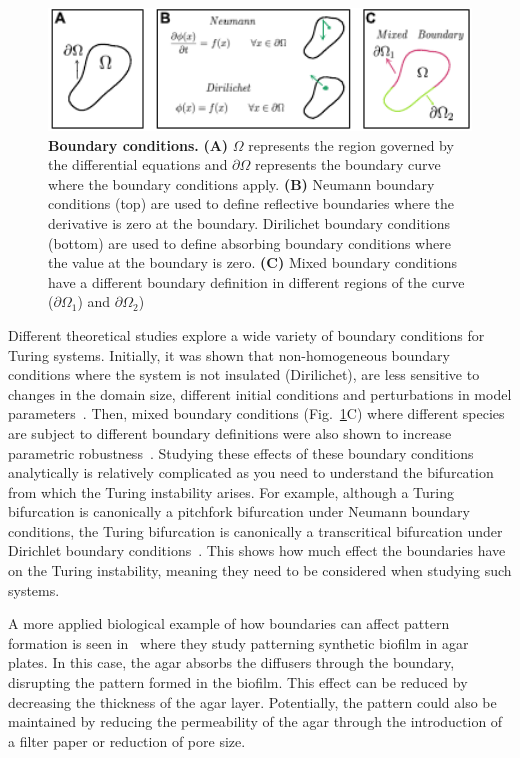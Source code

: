 \begin{figure}[H]
    \centering
    \includegraphics[width=1\textwidth]{chapters/Introduction/boundaries}
    \caption{\textbf{Boundary conditions.} \textbf{(A)} $\Omega$ represents the region governed by the differential equations and $\partial\Omega$ represents the boundary curve where the boundary conditions apply. \textbf{(B)} Neumann boundary conditions (top) are used to define reflective boundaries where the derivative is zero at the boundary. Dirilichet boundary conditions (bottom) are used to define absorbing boundary conditions where the value at the boundary is zero. \textbf{(C)} Mixed boundary conditions have a different boundary definition in different regions of the curve ($\partial\Omega_1$) and $\partial\Omega_2$)  }
    \label{fig:boundaries}
\end{figure}

Different theoretical studies explore a wide variety of boundary conditions for Turing systems.
Initially, it was shown that non-homogeneous boundary conditions where the system is not insulated (Dirilichet), are less sensitive to changes in the domain size, different initial conditions and perturbations in model parameters~\parencite{Arcuri1986}.
Then, mixed boundary conditions (Fig.~\ref{fig:boundaries}C) where different species are subject to different boundary definitions were also shown to increase parametric robustness~\parencite{Maini1993, Maini1997, Krause2021}.
Studying these effects of these boundary conditions analytically is relatively complicated as you need to understand the bifurcation from which the Turing instability arises.
For example, although a Turing bifurcation is canonically a pitchfork bifurcation under Neumann boundary conditions, the Turing bifurcation is canonically a transcritical bifurcation under Dirichlet boundary conditions~\parencite{Woolley2022}. %
This shows how much effect the boundaries have on the Turing instability, meaning they need to be considered when studying such systems.

A more applied biological example of how boundaries can affect pattern formation is seen in~\parencite{Krause2020} where they study patterning synthetic biofilm in agar plates.
In this case, the agar absorbs the diffusers through the boundary, disrupting the pattern formed in the biofilm.
This effect can be reduced by decreasing the thickness of the agar layer.
Potentially, the pattern could also be maintained by reducing the permeability of the agar through the introduction of a filter paper or reduction of pore size.

